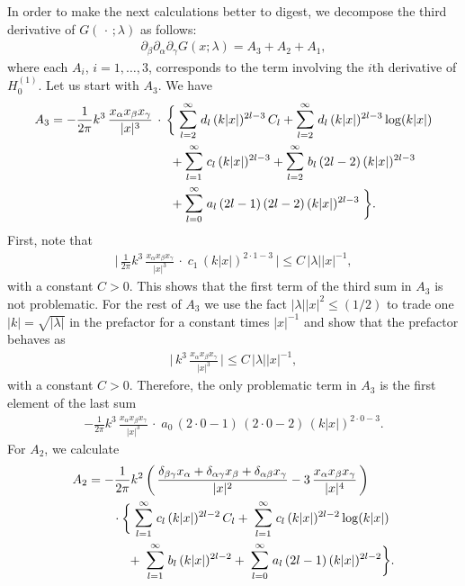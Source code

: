 In order to make the next calculations better to digest, we decompose the third derivative of $G(\,\cdot\, ; \lambda)$ as follows:
\begin{align*}
  \partial_\beta \partial_\alpha \partial_\gamma G(x; \lambda)
  = A_3 + A_2 + A_1,
\end{align*}
where each $A_i$, $i = 1,\dots,3$, corresponds to the term involving the $i$th derivative of $H_0^{(1)}$.
Let us start with $A_3$. 
We have
\begin{align*}
  A_3 = - \frac{1}{2 \pi } k^3 \, \frac{x_\alpha x_\beta x_\gamma}{|x|^3}  \,
  &\cdot\,\bigg\{
     \; \mathlarger{\sum}_{l = 2}^\infty \; d_l \, (k|x|)^{2l - 3} \, C_l +  \mathlarger{\sum}_{l = 2}^\infty \; d_l \, (k|x|)^{2l - 3} \log(k|x|)  \\
  &\quad\,  +  \mathlarger{\sum}_{l = 1}^\infty \; c_l \, (k|x|)^{2l - 3} +  \mathlarger{\sum}_{l = 2}^\infty \; b_l\, (2l - 2) \, (k|x|)^{2l - 3} \\
  &\quad\, +  \mathlarger{\sum}_{l = 0}^\infty \; a_l \, (2l - 1)\, (2l - 2) \, (k|x|)^{2l - 3} \;
  \bigg\}.
\end{align*}
First, note that
\begin{align*}
  \Big|\, \frac{1}{2\pi} k^3\, \frac{x_\alpha x_\beta x_\gamma}{|x|^3} \,\cdot\; c_1\, (k|x|)^{2 \cdot 1 -3} \,\Big| 
  \leq C \, |\lambda| |x|^{-1},
\end{align*}
with a constant $C > 0$.
This shows that the first term of the third sum in $A_3$ is not problematic.
For the rest of $A_3$ we use the fact $|\lambda| |x|^2 \leq (1/2)$ to trade one $|k| = \sqrt{|\lambda|}$ in the prefactor for a constant times $|x|^{-1}$ and show that the prefactor behaves as
\begin{align*}
  \Big|\, k^3 \, \frac{x_\alpha x_\beta x_\gamma}{|x|^3}\, \Big| 
  \leq C\, |\lambda| |x|^{-1}, 
\end{align*}
with a constant $C > 0$.
Therefore, the only problematic term in $A_3$ is the first element of the last sum
\begin{align}
  \label{eq:P1}
  \tag{P1}- \frac{1}{2 \pi } k^3\, \frac{x_\alpha x_\beta x_\gamma}{|x|^3} \, \cdot\;  a_0 \, (2 \cdot 0 - 1)\, (2 \cdot 0 - 2) \, (k|x|)^{2 \cdot 0 - 3} .
\end{align}
For $A_2$, we calculate
\begin{align*}
  A_2 &= - \frac{1}{2\pi} k^2\, \bigg(\, \frac{\delta_{\beta\gamma} x_\alpha + \delta_{\alpha \gamma} x_\beta + \delta_{\alpha \beta} x_\gamma}{|x|^2} - 3\, \frac{x_\alpha x_\beta x_\gamma}{|x|^4} \, \bigg) \\ 
  &\qquad \cdot 
  \bigg\{
    \; \mathlarger{\sum}_{l = 1}^\infty \; c_l \, (k|x|)^{2l - 2} \, C_l 
  + \; \mathlarger{\sum}_{l = 1}^\infty \; c_l \, (k|x|)^{2l - 2} \log(k|x|) \\
  &\qquad\quad\,+ \; \mathlarger{\sum}_{l = 1}^\infty \; b_l \, (k|x|)^{2l - 2} 
  + \; \mathlarger{\sum}_{l = 0}^\infty \; a_l\, (2l - 1) \, (k|x|)^{2l - 2} 
  \bigg\}.
\end{align*}
